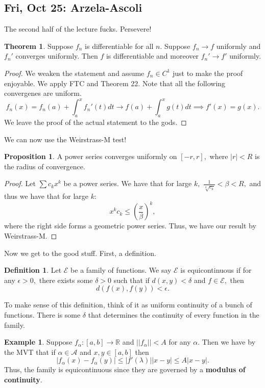 \documentclass[10pt, oneside]{article}
\newcommand{\bbR}{\mathbb{R}}
\theoremstyle{definition}
\newtheorem{exmp}{Example}[section]
\newtheorem{thm}{Theorem}
\newtheorem{defn}{Definition}
\newtheorem{prop}{Proposition}
\begin{document}
\newpage

\subsection{Fri, Oct 25: Arzela-Ascoli}
The second half of the lecture fucks. Persevere!
\begin{thm}
Suppose $f_n$ is differentiable for all $n.$ Suppose $f_n \to f$ uniformly and $f_n'$ converges uniformly. Then $f$ is differentiable and moreover $f_n' \to f'$ uniformly. 
\end{thm}
\begin{proof}
    We weaken the statement and assume $f_n \in C^1$ just to make the proof enjoyable. We apply FTC and Theorem 22. Note that all the following convergenes are uniform.
    \[f_n(x) = f_n(a) + \int_a^x f_n'(t)dt \to f(a) + \int_a^x g(t)dt \implies f'(x) =  g(x).\] We leave the proof of the actual statement to the gods.
\end{proof}
We can now use the Weirstrass-M test!
\begin{prop}
    A power series converges uniformly on $[-r,r],$ where $|r|< R$ is the radius of convergence.
\end{prop}
\begin{proof}
    Let $\sum c_k x^k$ be a power series. We have that for large  $k,$ $ \frac{1}{\sqrt[k]{c_k}}< \beta <R,$ and thus we have that for large $k:$
    \[x^kc_k \leq \left(\frac{x}{\beta}\right)^{k},\] where the right side forms a geometric power series. Thus, we have our result by Weirstrass-M.
\end{proof}
Now we get to the good stuff. First, a definition.
\begin{defn}
    Let $\mathcal{E}$ be a family of functions. We say $\mathcal{E}$ is equicontinuous if for  any $\epsilon>0,$ there exists some $\delta>0$ such that if $d(x,y)< \delta$ and $f\in \mathcal{E},$ then \[d(f(x), f(y)) < \epsilon.\]
\end{defn}
To make sense of this definition, think of it as uniform continuity of a bunch of functions. There is some $\delta$ that determines the continuity of every function in the family.
\begin{exmp}
    Suppose $f_\alpha: [a,b]\to \bbR$ and $||f_{\alpha}||< A$ for any $\alpha.$ Then we have by the MVT that if $\alpha \in \mathcal{A}$ and $x,y \in [a,b]$ then
    \[|f_\alpha(x)- f_\alpha(y)| \leq |f'(\lambda)||x-y|\leq A|x-y|.\] Thus, the family is equicontinuous since they are governed by a \textbf{modulus of continuity}. 
\end{exmp}
\end{document}
